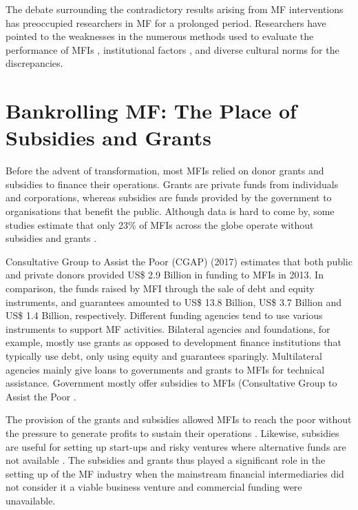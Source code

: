 \documentclass[a4paper, nobind]{templates/ociamthesis}
\begin{document}
The debate surrounding the contradictory results arising from MF interventions has preoccupied researchers in MF for a prolonged period. Researchers have pointed to the weaknesses in the numerous methods used to evaluate the performance of MFIs \autocite{awaworyi2016has}, institutional factors \autocite{kimmitt2017entrepreneurship}, and diverse cultural norms \autocite{shahriar2017lender} for the discrepancies.

\hypertarget{bankrolling-mf-the-place-of-subsidies-and-grants}{%
\section{Bankrolling MF: The Place of Subsidies and Grants}\label{bankrolling-mf-the-place-of-subsidies-and-grants}}

\noindent Before the advent of transformation, most MFIs relied on donor grants and subsidies to finance their operations. Grants are private funds from individuals and corporations, whereas subsidies are funds provided by the government to organisations that benefit the public. Although data is hard to come by, some studies estimate that only 23\% of MFIs across the globe operate without subsidies and grants \autocite{d2013unsubsidized}.

Consultative Group to Assist the Poor (CGAP) (2017) estimates that both public and private donors provided US\$ 2.9 Billion in funding to MFIs in 2013. In comparison, the funds raised by MFI through the sale of debt and equity instruments, and guarantees amounted to US\$ 13.8 Billion, US\$ 3.7 Billion and US\$ 1.4 Billion, respectively. Different funding agencies tend to use various instruments to support MF activities. Bilateral agencies and foundations, for example, mostly use grants as opposed to development finance institutions that typically use debt, only using equity and guarantees sparingly. Multilateral agencies mainly give loans to governments and grants to MFIs for technical assistance. Government mostly offer subsidies to MFIs (Consultative Group to Assist the Poor \autocite{cgap2017}.

The provision of the grants and subsidies allowed MFIs to reach the poor without the pressure to generate profits to sustain their operations \autocite{d2013unsubsidized}. Likewise, subsidies are useful for setting up start-ups and risky ventures where alternative funds are not available \autocite{bogan2012capital}. The subsidies and grants thus played a significant role in the setting up of the MF industry when the mainstream financial intermediaries did not consider it a viable business venture and commercial funding were unavailable.
\end{document}
